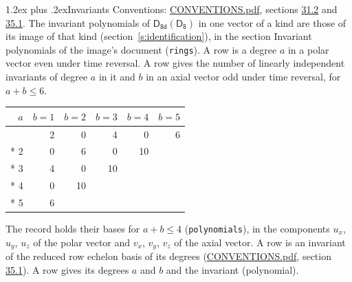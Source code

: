 \documentclass[10pt,a4paper]{article}
\makeatletter
\renewcommand\section{\@startsection{section}{1}{\z@}{-3ex plus -1ex minus -.2ex}%
  {1.2ex plus .2ex}{\normalfont\large\sffamily\bfseries\color{parttitle}}}
\numberwithin{equation}{section}
\newcommand{\grp}[1]{\mathsf{#1}}
\makeatother
\begin{document}
\section{Invariants}\label{s:invariants}
Conventions: \href{../../CONVENTIONS.pdf}{CONVENTIONS.pdf}, sections \href{../../CONVENTIONS.pdf\#conv.31.2}{31.2} and \href{../../CONVENTIONS.pdf\#conv.35.1}{35.1}.
The invariant polynomials of $\grp{D_{8d}}(\grp{D_{8}})$ in one vector of a kind are those of its image of that kind (section~\ref{s:identification}), in the section Invariant polynomials of the image's document (\texttt{rings}).
\leavevmode\label{n:index.degree.polar}\label{n:index.degree.axial}A row is a degree $a$ in a polar vector even under time reversal. A row gives the number of linearly independent invariants of degree $a$ in it and $b$ in an axial vector odd under time reversal, for $a + b \le 6$.
{\small\begin{longtable}{@{}rrrrrr@{}}\toprule
$a$ & $b = 1$ & $b = 2$ & $b = 3$ & $b = 4$ & $b = 5$\\\midrule\endhead
\bottomrule\endfoot\endlastfoot
1 & 2 & 0 & 4 & 0 & 6\\*
2 & 0 & 6 & 0 & 10 & \\*
3 & 4 & 0 & 10 &  & \\*
4 & 0 & 10 &  &  & \\*
5 & 6 &  &  &  & \\
\bottomrule\end{longtable}}
\leavevmode\label{n:local.component.polar}\label{n:local.component.axial}The record holds their bases for $a + b \le 4$ (\texttt{polynomials}), in the components $u_{x}$, $u_{y}$, $u_{z}$ of the polar vector and $v_{x}$, $v_{y}$, $v_{z}$ of the axial vector. \label{n:head.polynomial}A row is an invariant of the reduced row echelon basis of its degrees (\href{../../CONVENTIONS.pdf}{CONVENTIONS.pdf}, section \href{../../CONVENTIONS.pdf\#conv.35.1}{35.1}). A row gives its degrees $a$ and $b$ and the invariant (polynomial).
\end{document}
